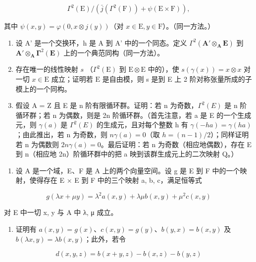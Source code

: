 \[
\Gamma^ {2} (\mathrm{E}) / (\bar {j} (\Gamma^ {2} (\mathrm{F})) + \psi (\mathrm{E} \times \mathrm{F})),
\]

其中 \(\psi(x, y) = \varphi(0, x \otimes j(y))\)（对 \(x \in \mathrm{E}, y \in \mathrm{F}\)）。（同一方法。）

\begin{enumerate}
\def\labelenumi{\alph{enumi})}
\setcounter{enumi}{3}
\item
  设 A' 是一个交换环，h 是 A 到 A' 中的一个同态。定义 \(\Gamma^{2}(\mathbf{A}'\otimes_{\mathbf{A}}\mathbf{E})\) 到 \(\mathbf{A}'\otimes_{\mathbf{A}}\symbf{\Gamma}^{2}(\mathbf{E})\) 上的一个典范同构（同一方法）。
\item
  存在唯一的线性映射 \(s\) （\(\Gamma^{2}(\mathrm{E})\) 到 \(\mathrm{E}\otimes\mathrm{E}\) 中的），使 \(s(\gamma(x))=x\otimes x\) 对一切 \(x\in\mathrm{E}\) 成立；证明若 \(\mathrm{E}\) 是自由模，则 s 是到 E 上 2 阶对称张量所成的子模上的一个同构。
\item
  假设 A = Z 且 E 是 n 阶有限循环群。证明：若 n 为奇数，\(\Gamma^{2}(E)\) 是 n 阶循环群；若 n 为偶数，则是 2n 阶循环群。（首先注意，若 a 是 E 的一个生成元，则 \(\gamma(a)\) 是 \(\Gamma^{2}(E)\) 的生成元，且对每个整数 h 有 \(\gamma(-ha) = \gamma(ha)\)；由此推出，若 n 为奇数，则 \(n\gamma(a) = 0\)（取 \(h = (n - 1)/2\)）；同样证明若 n 为偶数则 \(2n\gamma(a) = 0\)。最后证明：若 n 为奇数（相应地偶数），存在 E 到 n（相应地 2n）阶循环群中的把 a 映到该群生成元上的二次映射 Q。）
\end{enumerate}

\begin{enumerate}
\def\labelenumi{\arabic{enumi})}
\setcounter{enumi}{7}
\tightlist
\item
  设 A 是一个域，E、F 是 A 上的两个向量空间。设 g 是 E 到 F 中的一个映射，使得存在 E × E 到 F 中的三个映射 a, b, c，满足恒等式
\end{enumerate}

\[
g (\lambda x + \mu y) = \lambda^ {2} a (x, y) + \lambda \mu b (x, y) + \mu^ {2} c (x, y)\tag{4}
\]

对 E 中一切 x, y 与 A 中 λ, μ 成立。

\begin{enumerate}
\def\labelenumi{\alph{enumi})}
\tightlist
\item
  证明有 \(a(x, y) = g(x)\)、\(c(x, y) = g(y)\)、\(b(y, x) = b(x, y)\) 及 \(b(\lambda x, y) = \lambda b(x, y)\)；此外，若令
\end{enumerate}

\[
d (x, y, z) = b (x + y, z) - b (x, z) - b (y, z)
\]

